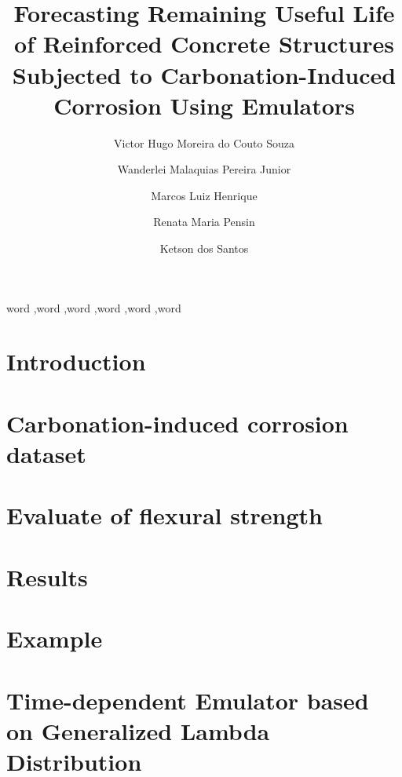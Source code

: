 \documentclass[preprint,11pt]{elsarticle}
\theoremstyle{plain}
\theoremstyle{definition}
\theoremstyle{remark}
\begin{document}
\begin{frontmatter}

\title{Forecasting Remaining Useful Life of Reinforced Concrete Structures Subjected to Carbonation-Induced Corrosion Using Emulators}

\author[label1]{Victor Hugo Moreira do Couto Souza}
\author[label1,label2]{Wanderlei Malaquias Pereira Junior}
\author[label4]{Marcos Luiz Henrique}
\author[label1]{Renata Maria Pensin}
\author[label2,label3]{Ketson dos Santos}
\address[label1]{Federal University of Catalão – UFCAT, Catalão, 75701-180, Goiás, Brazil}
\address[label2]{University of Minnesota, Minneapolis, MN 55455, United States}
\address[label3]{CEGE - UMN Department of Civil, Environmental, and Geo-Engineering, 790 Civil Engineering Bldg, 122, 500 Pillsbury Dr SE, Minneapolis, MN 55455, United States}
\address[label4]{NICEN - Interdisciplinary Center for Exact and Natural Sciences - CA, Caruaru, 55014-900, Pernambuco, Brazil}

\begin{abstract}
\lipsum[1]
\end{abstract}

\begin{keyword}
word \sep word \sep word \sep word \sep word \sep word

\end{keyword}

\end{frontmatter}

\linenumbers

\section{Introduction}\label{sec:intro}
\section{Carbonation-induced corrosion dataset}\label{sec:carb}
\section{Evaluate of flexural strength}\label{sec:concrete}
\section{Results}\label{sec:res}
\section{Example}\label{sec:exem}
%
\section{Time-dependent Emulator based on Generalized Lambda Distribution}


\end{document}
